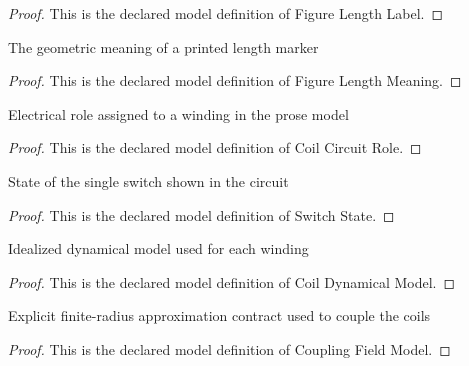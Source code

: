 \begin{proof}
  This is the declared model definition of Figure Length Label.
\end{proof}
\begin{definition}
  \label{def:physics:phyx-mini-0978:phyxminiproblems-problemphyxmini0978-figurelengthmeaning}
  The geometric meaning of a printed length marker
\end{definition}
\begin{proof}
  This is the declared model definition of Figure Length Meaning.
\end{proof}
\begin{definition}
  \label{def:physics:phyx-mini-0978:phyxminiproblems-problemphyxmini0978-coilcircuitrole}
  Electrical role assigned to a winding in the prose model
\end{definition}
\begin{proof}
  This is the declared model definition of Coil Circuit Role.
\end{proof}
\begin{definition}
  \label{def:physics:phyx-mini-0978:phyxminiproblems-problemphyxmini0978-switchstate}
  State of the single switch shown in the circuit
\end{definition}
\begin{proof}
  This is the declared model definition of Switch State.
\end{proof}
\begin{definition}
  \label{def:physics:phyx-mini-0978:phyxminiproblems-problemphyxmini0978-coildynamicalmodel}
  Idealized dynamical model used for each winding
\end{definition}
\begin{proof}
  This is the declared model definition of Coil Dynamical Model.
\end{proof}
\begin{definition}
  \label{def:physics:phyx-mini-0978:phyxminiproblems-problemphyxmini0978-couplingfieldmodel}
  Explicit finite-radius approximation contract used to couple the coils
\end{definition}
\begin{proof}
  This is the declared model definition of Coupling Field Model.
\end{proof}
